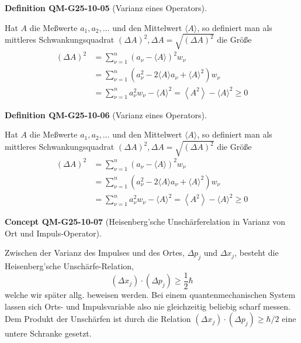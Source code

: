 \documentclass[10pt, letterpaper]{article}
\newcommand{\CustomHeading}[3]{%
  \par\medskip\noindent%
  \textbf{#1 #2} \textnormal{(#3)}.\enskip%
}
\newenvironment{DEF}[2]{\CustomHeading{Definition}{#1}{#2}}{}
\newenvironment{CONC}[2]{\CustomHeading{Concept}{#1}{#2}}{}
\begin{document}
\begin{DEF}{QM-G25-10-05}{Varianz eines Operators}
Hat $A$ die Meßwerte $a_{1}, a_{2}, \ldots$ und den Mittelwert $\langle A\rangle$, so definiert man als mittleres Schwankungsquadrat $(\Delta A)^{2}, \Delta A=\sqrt{(\Delta A)^{2}}$ die Größe
$$
\begin{aligned}
(\Delta A)^{2} & =\sum_{\nu=1}^{n}\left(a_{\nu}-\langle A\rangle\right)^{2} w_{\nu} \\
& =\sum_{\nu=1}^{n}\left(a_{\nu}^{2}-2\langle A\rangle a_{\nu}+\langle A\rangle^{2}\right) w_{\nu} \\
& =\sum_{\nu=1}^{n} a_{\nu}^{2} w_{\nu}-\langle A\rangle^{2}=\left\langle A^{2}\right\rangle-\langle A\rangle^{2} \geq 0
\end{aligned}
$$
\end{DEF}

\begin{DEF}{QM-G25-10-06}{Varianz eines Operators}
Hat $A$ die Meßwerte $a_{1}, a_{2}, \ldots$ und den Mittelwert $\langle A\rangle$, so definiert man als mittleres Schwankungsquadrat $(\Delta A)^{2}, \Delta A=\sqrt{(\Delta A)^{2}}$ die Größe
$$
\begin{aligned}
(\Delta A)^{2} & =\sum_{\nu=1}^{n}\left(a_{\nu}-\langle A\rangle\right)^{2} w_{\nu} \\
& =\sum_{\nu=1}^{n}\left(a_{\nu}^{2}-2\langle A\rangle a_{\nu}+\langle A\rangle^{2}\right) w_{\nu} \\
& =\sum_{\nu=1}^{n} a_{\nu}^{2} w_{\nu}-\langle A\rangle^{2}=\left\langle A^{2}\right\rangle-\langle A\rangle^{2} \geq 0
\end{aligned}
$$
\end{DEF}

\begin{CONC}{QM-G25-10-07}{Heisenberg'sche Unschärferelation in Varianz von Ort und Impuls-Operator}
Zwischen der Varianz des Impulses und des Ortes, $\Delta p_{j}$ und $\Delta x_{j}$, besteht die Heisenberg'sche Unschärfe-Relation,
$$
\left(\Delta x_{j}\right) \cdot\left(\Delta p_{j}\right) \geq \frac{1}{2} \hbar
$$
welche wir später allg. beweisen werden. Bei einem quantenmechanischen System lassen sich Orts- und Impulsvariable also nie gleichzeitig beliebig scharf messen. Dem Produkt der Unschärfen ist durch die Relation $\left(\Delta x_{j}\right) \cdot\left(\Delta p_{j}\right) \geq \hbar / 2$ eine untere Schranke gesetzt.
\end{CONC}
\end{document}
